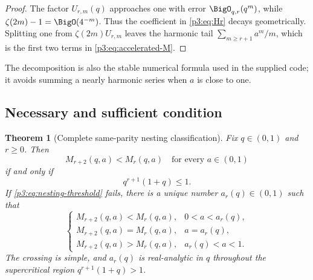 \documentclass[11pt]{article}
\numberwithin{equation}{section}
\newtheorem{theorem}{Theorem}[section]
\theoremstyle{definition}
\theoremstyle{remark}
\begin{document}
\begin{proof}
The factor $U_{r,m}(q)$ approaches one with error $\BigO_{q,r}(q^m)$, while
$\zeta(2m)-1=\BigO(4^{-m})$.  Thus the coefficient in \eqref{p3:eq:Hr} decays
geometrically.  Splitting one from $\zeta(2m)U_{r,m}$ leaves the harmonic tail
$\sum_{m\ge r+1}a^m/m$, which is the first two terms in \eqref{p3:eq:accelerated-M}.
\end{proof}

The decomposition is also the stable numerical formula used in the supplied code; it avoids
summing a nearly harmonic series when $a$ is close to one.

\subsection{Necessary and sufficient condition}

\begin{theorem}[Complete same-parity nesting classification]\label{p3:thm:nesting-classification}
Fix $q\in(0,1)$ and $r\ge0$.  Then
\begin{equation}
 M_{r+2}(q,a)<M_r(q,a)\quad\text{for every }a\in(0,1)
 \label{p3:eq:uniform-nesting}
\end{equation}
if and only if
\begin{equation}
 \boxed{q^{r+1}(1+q)\le1.}
 \label{p3:eq:nesting-threshold}
\end{equation}
If \eqref{p3:eq:nesting-threshold} fails, there is a unique number
$a_r(q)\in(0,1)$ such that
\begin{equation}
 \begin{cases}
 M_{r+2}(q,a)<M_r(q,a),&0<a<a_r(q),\\
 M_{r+2}(q,a)=M_r(q,a),&a=a_r(q),\\
 M_{r+2}(q,a)>M_r(q,a),&a_r(q)<a<1.
 \end{cases}
 \label{p3:eq:crossing-classification}
\end{equation}
The crossing is simple, and $a_r(q)$ is real-analytic in $q$ throughout the supercritical
region $q^{r+1}(1+q)>1$.
\end{theorem}
\end{document}
